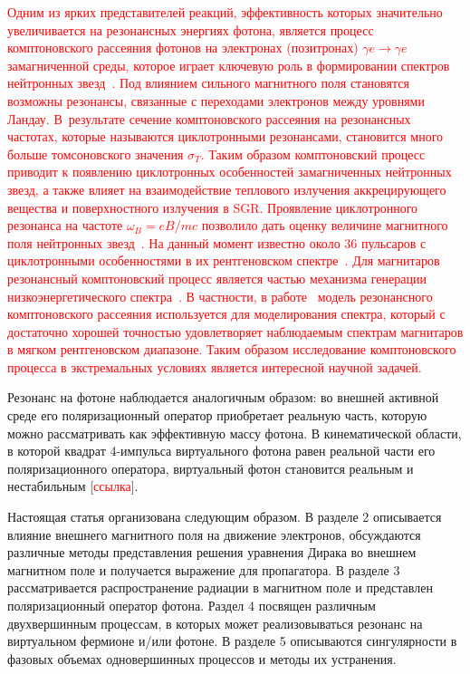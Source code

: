\textcolor{red}{Одним из ярких представителей реакций, эффективность которых значительно увеличивается на резонансных энергиях фотона, является процесс комптоновского  рассеяния фотонов на электронах (позитронах) $\gamma e \to \gamma e$ 
замагниченной среды, которое играет ключевую роль в формировании спектров нейтронных звезд~\cite{Miller:1995,Bulik:1997,Suleimanov:2007it,Nobili:2008,Taverna:2014}.
Под влиянием сильного магнитного поля становятся возможны резонансы, связанные с переходами электронов между уровнями Ландау. В~результате сечение комптоновского рассеяния на резонансных частотах, которые называются циклотронными резонансами, становится много больше томсоновского значения $\sigma_T$. Таким образом комптоновский процесс приводит к появлению циклотронных особенностей замагниченных нейтронных звезд, а также влияет на взаимодействие теплового излучения аккрецирующего вещества и поверхностного излучения в SGR. Проявление циклотронного резонанса на частоте $\omega_B=eB/mc$ позволило дать оценку величине магнитного поля нейтронных звезд~\cite{Mitrofanov:1982}.  На данный момент известно около 36 пульсаров с циклотронными особенностями в их рентгеновском спектре~\cite{Staubert:2019}. Для магнитаров резонансный комптоновский процесс является частью механизма генерации низкоэнергетического спектра~\cite{Lyutikov:2002,Rea:2008}. В частности, в работе~\cite{Rea:2008} модель резонансного комптоновского рассеяния используется для моделирования спектра, который с достаточно хорошей точностью удовлетворяет наблюдаемым спектрам магнитаров в мягком рентгеновском диапазоне. Таким образом исследование комптоновского процесса в экстремальных условиях является интересной научной задачей.}

Резонанс на фотоне наблюдается аналогичным образом: во внешней активной среде его поляризационный оператор приобретает реальную часть, которую можно рассматривать как эффективную массу фотона. В кинематической 
области, в которой квадрат 4-импульса виртуального фотона равен реальной части его поляризационного оператора, виртуальный фотон становится реальным и нестабильным [\textcolor{red}{ссылка}].

Настоящая статья организована следующим образом. В разделе 2 описывается влияние внешнего магнитного поля на движение электронов, обсуждаются различные методы представления решения уравнения Дирака во внешнем магнитном поле и получается выражение для пропагатора. В разделе 3 рассматривается распространение радиации в магнитном поле и представлен поляризационный оператор фотона. Раздел 4 посвящен различным двухвершинным процессам, в которых может 
реализовываться резонанс на виртуальном фермионе и/или фотоне. В разделе 5 описываются сингулярности в фазовых объемах одновершинных процессов и методы их устранения.
